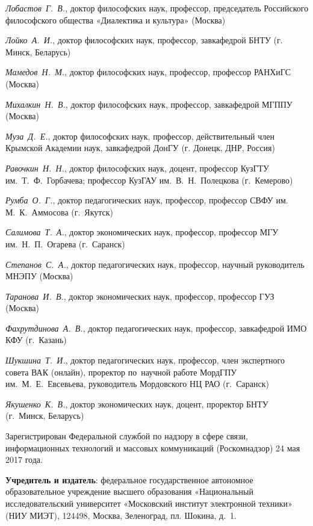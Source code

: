 \begin{multicols}{2}
\begin{flushleft}
    \noindent \textit{Лобастов Г. В.}, доктор философских наук, профессор, председатель Российского философского общества «Диалектика и культура» (Москва)
    
    \noindent \textit{Лойко А. И.}, доктор философских наук, профессор, завкафедрой БНТУ (г. Минск, Беларусь)
    
    \noindent \textit{Мамедов Н. М.}, доктор философских наук, профессор, профессор РАНХиГС (Москва)
    
    \noindent \textit{Михалкин Н. В.}, доктор философских наук, профессор, завкафедрой МГППУ (Москва)
    
    \noindent \textit{Муза Д. Е.}, доктор философских наук, профессор, действительный член Крымской Академии наук, завкафедрой ДонГУ (г. Донецк, ДНР, Россия) 
    
    \noindent \textit{Равочкин Н. Н.}, доктор философских наук, доцент, профессор КузГТУ им. Т. Ф. Горбачева; профессор КузГАУ им. В. Н. Полецкова (г. Кемерово)
    
    \noindent \textit{Румба О. Г.}, доктор педагогических наук, профессор, профессор СВФУ им. М. К. Аммосова (г. Якутск)
    
    \noindent \textit{Салимова Т. А.}, доктор экономических наук, профессор, профессор МГУ им. Н. П. Огарева (г. Саранск)
    
    \noindent \textit{Степанов С. А.}, доктор педагогических наук, профессор, научный руководитель МНЭПУ (Москва)
    
    \noindent \textit{Таранова И. В.}, доктор экономических наук, профессор, профессор ГУЗ (Москва)
   
    \noindent \textit{Фахрутдинова А. В.}, доктор педагогических наук, профессор, завкафедрой ИМО КФУ (г. Казань)
    
    \noindent \textit{Шукшина Т. И.}, доктор педагогических наук, профессор, член экспертного совета ВАК (онлайн), проректор по научной работе МордГПУ им. М. Е. Евсевьева, руководитель Мордовского НЦ РАО (г. Саранск)
    
    \noindent \textit{Якушенко К. В.}, доктор экономических наук, доцент, проректор БНТУ (г. Минск, Беларусь)
\end{flushleft}    
\end{multicols}

\begin{flushleft}
\scriptsize
Зарегистрирован Федеральной службой по надзору в сфере связи, информационных технологий
и массовых коммуникаций (Роскомнадзор) 24 мая 2017 года.


\textbf{Учредитель и издатель}: федеральное государственное автономное образовательное учреждение
высшего образования «Национальный исследовательский университет «Московский институт
электронной техники» (НИУ МИЭТ), 124498, Москва, Зеленоград, пл. Шокина, д. 1.
\end{flushleft}

